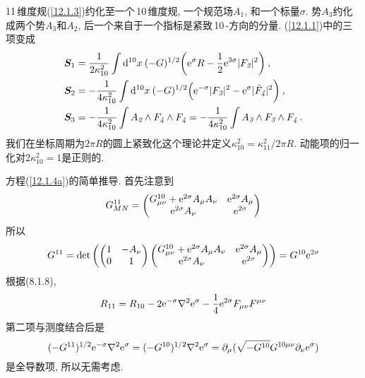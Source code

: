 11\,维度规(\ref{12.1.3})约化至一个\,10\,维度规, 一个规范场$ A_{\textit{1}}$, 和一个标量$ \sigma$. 势$ A_{\textit{3}} $约化成两个势$ A_{\textit{3}} $和$ A_{\textit{2}}$, 后一个来自于一个指标是紧致\,10\,-方向的分量. (\ref{12.1.1})中的三项变成
\begin{subequations}
    \begin{align}
        \bm{S}_{1} &=\frac{1}{2\kappa_{10}^{2}}\int \mathrm{d}^{10}x\:(-G)^{1/2}\biggl(\mathrm{e}^{\sigma}R-\frac{1}{2}\mathrm{e}^{3\sigma}\lvert F_{\textit{2}}\rvert^{2}\biggr) \:, \label{12.1.4a} \\
        \bm{S}_{2} &=-\frac{1}{4\kappa_{10}^{2}}\int \mathrm{d}^{10}x\:(-G)^{1/2}\Bigl(\mathrm{e}^{-\sigma}\lvert F_{\textit{3}}\rvert^{2}-\mathrm{e}^{\sigma}\lvert \tilde{F}_{\textit{4}}\rvert^{2}\biggr) \:, \label{12.1.4b} \\
         \bm{S}_{3} &= - \frac{1}{4\kappa_{10}^{2}}\int A_{\textit{2}}\wedge  F_{\textit{4}} \wedge F_{\textit{4}}
         = - \frac{1}{4\kappa_{10}^{2}}\int A_{\textit{3}}\wedge  F_{\textit{3}} \wedge F_{\textit{4}} \:. \label{12.1.4c}
     \end{align}  \label{12.1.4}
\end{subequations}
我们在坐标周期为$ 2\pi R $的圆上紧致化这个理论并定义$ \kappa_{10}^{2}=\kappa_{11}^{2}/2\pi R$. 动能项的归一化对$ 2\kappa_{10}^{2}=1 $是正则的.

\begin{tcolorbox}
方程(\ref{12.1.4a})的简单推导. 首先注意到
\[
 G_{MN}^{11}=\begin{pmatrix}
     G_{\mu\nu}^{10}+\mathrm{e}^{2\sigma} A_{\mu}A_{\nu} & \mathrm{e}^{2\sigma}A_{\mu} \\
     \mathrm{e}^{2\sigma} A_{\nu} &\mathrm{e}^{2\sigma}
 \end{pmatrix}    
 \]
 所以
 \[
    G^{11}=\operatorname{det} \left(\begin{pmatrix}
        1 & -A_{\nu} \\
        0 & 1
    \end{pmatrix}    \begin{pmatrix}
        G_{\mu\nu}^{10}+\mathrm{e}^{2\sigma} A_{\mu}A_{\nu} & \mathrm{e}^{2\sigma}A_{\mu} \\
        \mathrm{e}^{2\sigma} A_{\nu} &\mathrm{e}^{2\sigma}
    \end{pmatrix}    \right)   = G^{10} \mathrm{e}^{2\sigma}
\]
根据(\textcolor{foo}{8.1.8}),
\[
            R_{11}=R_{10}-2\mathrm{e}^{-\sigma} \nabla^{2} \mathrm{e}^{\sigma} -\frac{1}{4}\mathrm{e}^{2\sigma}F_{\mu\nu}F^{\mu\nu}  
\]
第二项与测度结合后是 
\[ 
    (-G^{11})^{1/2}\mathrm{e}^{-\sigma} \nabla^{2} \mathrm{e}^{\sigma}=(-G^{10})^{1/2}\nabla^{2}\mathrm{e}^{\sigma}=\partial_{\mu}(\sqrt{-G^{10}}G^{10\mu\nu}\partial_{\nu}\mathrm{e}^{\sigma})
\]    
是全导数项, 所以无需考虑.
\end{tcolorbox}
   
